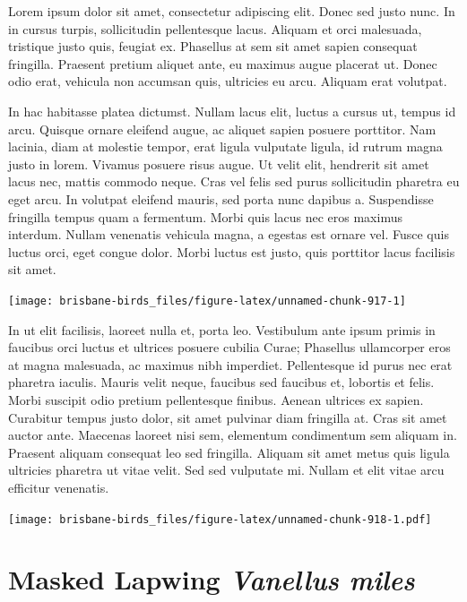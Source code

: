 \documentclass[]{book}
\let\origfigure\figure
\let\endorigfigure\endfigure
\renewenvironment{figure}[1][2] {
  \expandafter\origfigure\expandafter[H]
} {
  \endorigfigure
}
\begin{document}
Lorem ipsum dolor sit amet, consectetur adipiscing elit. Donec sed justo
nunc. In in cursus turpis, sollicitudin pellentesque lacus. Aliquam et
orci malesuada, tristique justo quis, feugiat ex. Phasellus at sem sit
amet sapien consequat fringilla. Praesent pretium aliquet ante, eu
maximus augue placerat ut. Donec odio erat, vehicula non accumsan quis,
ultricies eu arcu. Aliquam erat volutpat.

In hac habitasse platea dictumst. Nullam lacus elit, luctus a cursus ut,
tempus id arcu. Quisque ornare eleifend augue, ac aliquet sapien posuere
porttitor. Nam lacinia, diam at molestie tempor, erat ligula vulputate
ligula, id rutrum magna justo in lorem. Vivamus posuere risus augue. Ut
velit elit, hendrerit sit amet lacus nec, mattis commodo neque. Cras vel
felis sed purus sollicitudin pharetra eu eget arcu. In volutpat eleifend
mauris, sed porta nunc dapibus a. Suspendisse fringilla tempus quam a
fermentum. Morbi quis lacus nec eros maximus interdum. Nullam venenatis
vehicula magna, a egestas est ornare vel. Fusce quis luctus orci, eget
congue dolor. Morbi luctus est justo, quis porttitor lacus facilisis sit
amet.

\begin{figure}
\texttt{[image: brisbane-birds\_files/figure-latex/unnamed-chunk-917-1]} \caption{insert figure caption}\label{fig:unnamed-chunk-917}
\end{figure}

In ut elit facilisis, laoreet nulla et, porta leo. Vestibulum ante ipsum
primis in faucibus orci luctus et ultrices posuere cubilia Curae;
Phasellus ullamcorper eros at magna malesuada, ac maximus nibh
imperdiet. Pellentesque id purus nec erat pharetra iaculis. Mauris velit
neque, faucibus sed faucibus et, lobortis et felis. Morbi suscipit odio
pretium pellentesque finibus. Aenean ultrices ex sapien. Curabitur
tempus justo dolor, sit amet pulvinar diam fringilla at. Cras sit amet
auctor ante. Maecenas laoreet nisi sem, elementum condimentum sem
aliquam in. Praesent aliquam consequat leo sed fringilla. Aliquam sit
amet metus quis ligula ultricies pharetra ut vitae velit. Sed sed
vulputate mi. Nullam et elit vitae arcu efficitur venenatis.

\begin{figure}
\centering
\texttt{[image: brisbane-birds\_files/figure-latex/unnamed-chunk-918-1.pdf]}
\caption{\label{fig:unnamed-chunk-918}insert figure caption}
\end{figure}

\section{\texorpdfstring{Masked Lapwing \emph{Vanellus
miles}}{Masked Lapwing Vanellus miles}}\label{masked-lapwing-vanellus-miles}
\end{document}
